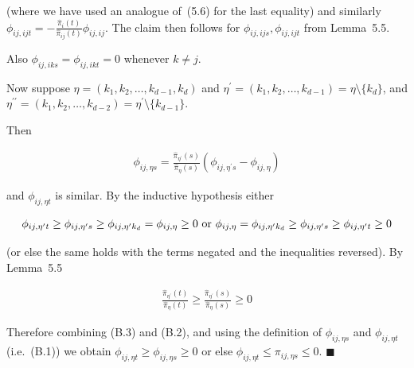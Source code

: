 (where we have used an analogue of (5.6) for the last equality) and similarly $\phi_{ij,ijt}=-\frac{\hat{\pi}_{i}(t)}{\hat{\pi}_{ij}(t)}\phi_{ij,ij}$. The claim then follows for $\phi_{ij,ijs},\phi_{ij,ijt}$ from Lemma 5.5.\par




Also $\phi_{ij,iks}=\phi_{ij,ikt}=0$ whenever $k\neq j$.\par




Now suppose $\eta=(k_{1},k_{2},\dots,k_{d-1},k_{d})$ and $\eta^{\prime}=(k_{1},k_{2},\dots,k_{d-1})=\eta\setminus\{k_{d}\}$, and $\eta^{\prime\prime}=(k_{1},k_{2},\dots,k_{d-2})=\eta^{\prime}\setminus\{k_{d-1}\}$.\par




Then\par


\[\begin{gathered}
\displaystyle\phi_{ij,\eta s}=\frac{\hat{\pi}_{\eta^{\prime}}(s)}{\hat{\pi}_{\eta}(s)}(\phi_{ij,\eta^{\prime}s}-\phi_{ij,\eta})
\end{gathered}\]


and $\phi_{ij,\eta t}$ is similar. By the inductive hypothesis either\par




\[\begin{gathered}
\displaystyle\phi_{ij,\eta^{\prime}t}\geq\phi_{ij,\eta^{\prime}s}\geq\phi_{ij,\eta^{\prime}k_{d}}=\phi_{ij,\eta}\geq 0\textnormal{ or }\phi_{ij,\eta}=\phi_{ij,\eta^{\prime}k_{d}}\geq\phi_{ij,\eta^{\prime}s}\geq\phi_{ij,\eta^{\prime}t}\geq 0
\end{gathered}\]


(or else the same holds with the terms negated and the inequalities reversed).
By Lemma 5.5\par


\[\begin{gathered}
\displaystyle\frac{\hat{\pi}_{\eta^{\prime}}(t)}{\hat{\pi}_{\eta}(t)}\geq\frac{\hat{\pi}_{\eta^{\prime}}(s)}{\hat{\pi}_{\eta}(s)}\geq 0
\end{gathered}\]




Therefore combining (B.3) and (B.2), and using the definition of $\phi_{ij,\eta s}$ and $\phi_{ij,\eta t}$ (i.e. (B.1)) we obtain $\phi_{ij,\eta t}\geq\phi_{ij,\eta s}\geq 0$ or else $\phi_{ij,\eta t}\leq\pi_{ij,\eta s}\leq 0$.
\ensuremath{\blacksquare}\par





